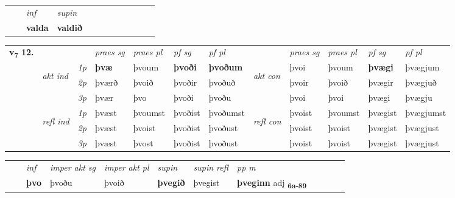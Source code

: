 \begin{tabular}{llllllllllll}
 & & \textit{inf}      & \textit{supin}       \\*
  & & \textbf{valda}       &  \textbf{valdið}   \\*
\cmidrule{1-12}
\end{tabular}



\begin{tabular}{llllllllllll} \toprule
\multirow{4}{*}{{{\textbf{v{\textsubscript{7}}} \Large{\textbf{12.}}}}}  & &   &  \textit{praes sg}  & \textit{praes pl}  &\textit{ pf sg} & \textit{pf pl} &  &  \textit{praes sg}  & \textit{praes pl}  & \textit{pf sg} & \textit{pf pl } \\*
	\cmidrule{4-7} \cmidrule{9-12}
 & \multirow{3}{*}{\begin{turn}{90}\textit{akt ind}\end{turn}} & {\textit{1p}} & \textbf{þvæ} & þvoum    & \textbf{þvoði} & \textbf{þvoðum} & \multirow{3}{*}{\begin{turn}{90}\textit{akt con}\end{turn}} &þvoi & þvoum & \textbf{þvægi} & þvægjum\\*
& &  {\textit{2p}} &  þværð  & þvoið   & þvoðir & þvoðuð & & þvoir & þvoið & þvægir & þvægjuð \\*
& &  {\textit{3p}} & þvær & þvo   & þvoði & þvoðu & & þvoi & þvoi& þvægi & þvægju  \\*
\cmidrule{4-7} \cmidrule{9-12}
 &\multirow{3}{*}{\begin{turn}{90}\textit{refl ind}\end{turn}} & {\textit{1p}} & þvæst & þvoumst    & þvoðist & þvoðumst & \multirow{3}{*}{\begin{turn}{90}\textit{refl con}\end{turn}}  &þvoist & þvoumst & þvægist & þvægjumst\\*
 &&  {\textit{2p}} &  þvæst  & þvoist   & þvoðist & þvoðust & &þvoist & þvoist & þvægist & þvægjust \\*
& &  {\textit{3p}} & þvæst & þvost   & þvoðist & þvoðust & & þvoist & þvoist& þvægist & þvægjust  \\*
\cmidrule{4-7} \cmidrule{9-12}
\end{tabular}


\begin{tabular}{llllllllllll}
 & & \textit{inf} & \textit{imper akt sg} & \textit{imper akt pl}    & \textit{supin} & \textit{supin refl} & \textit{pp m}     \\*
  & & \textbf{þvo} & þvoðu  & þvoið    &  \textbf{þvegið} & þvegist & \textbf{þveginn} adj \textbf{\textsubscript{6a-89}} \\*
\cmidrule{1-12}
\end{tabular}



